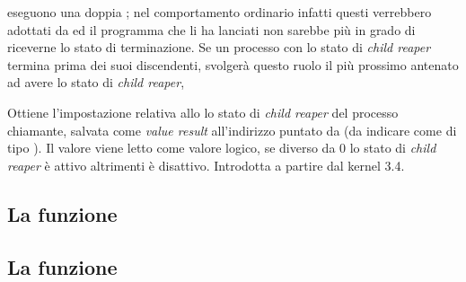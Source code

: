 \begin{basedescript}{\desclabelwidth{1.5cm}\desclabelstyle{\nextlinelabel}}
  eseguono una doppia ; nel comportamento ordinario infatti questi
  verrebbero adottati da  ed il programma che li ha lanciati non
  sarebbe più in grado di riceverne lo stato di terminazione. Se un processo
  con lo stato di \textit{child reaper} termina prima dei suoi discendenti,
  svolgerà questo ruolo il più prossimo antenato ad avere lo stato di
  \textit{child reaper}, 
\item[\constd{PR\_GET\_CHILD\_SUBREAPER}] Ottiene l'impostazione relativa allo
  lo stato di \textit{child reaper} del processo chiamante, salvata come
  \textit{value result} all'indirizzo puntato da  (da indicare
  come di tipo ). Il valore viene letto come valore logico, se
  diverso da 0 lo stato di \textit{child reaper} è attivo altrimenti è
  disattivo. Introdotta a partire dal kernel 3.4.






\label{sec:prctl_operation}
\end{basedescript}


\subsection{La funzione }
\label{sec:process_ptrace}



\subsection{La funzione }
\label{sec:process_kcmp}

